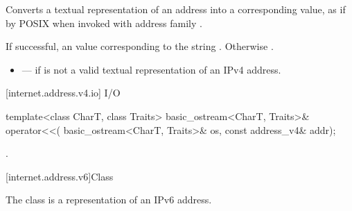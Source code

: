 \begin{itemdescr}
\pnum
\effects Converts a textual representation of an address into a corresponding  value, as if by POSIX  when invoked with address family .

\pnum
\returns If successful, an  value corresponding to the string . Otherwise .

\pnum
\errors
\begin{itemize}
\item
{} --- if  is not a valid textual representation of an IPv4 address.
\end{itemize}
\end{itemdescr}



[internet.address.v4.io]{ I/O}

%
\begin{itemdecl}
template<class CharT, class Traits>
  basic_ostream<CharT, Traits>& operator<<(
    basic_ostream<CharT, Traits>& os, const address_v4& addr);
\end{itemdecl}

\begin{itemdescr}
\pnum
\returns {}.
\end{itemdescr}




[internet.address.v6]{Class }

\pnum
The class  is a representation of an IPv6 address.

